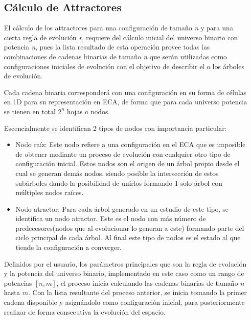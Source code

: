\documentclass[]{article}
\begin{document}
		\subsection{Cálculo de Attractores}
			\justifying
			El cálculo de los attractores para una configuración de tamaño \textit{n} y para una cierta regla de evolución \textit{r}, requiere del cálculo inicial del universo binario con potencia \textit{n}, pues la lista resultado de esta operación provee todas las combinaciones de cadenas binarias de tamaño \textit{n} que serán utilizadas como configuraciones iniciales de evolución con el objetivo de describir el o los árboles de evolución.
			
			\hfill\break
			\justifying
			Cada cadena binaria corresponderá con una configuración en su forma de células en 1D para su representación en ECA, de forma que para cada universo potencia se tienen en total $2^n$ hojas o nodos.
			
			\hfill\break
			\justifying
			Escencialmente se identifican 2 tipos de nodos con importancia particular:
			\begin{itemize}
				\item Nodo raíz: Este nodo refiere a una configuración en el ECA que es imposible de obtener mediante un proceso de evolución con cualquier otro tipo de configuración inicial. Estos nodos son el origen de un árbol propio desde el cual se generan demás nodos, siendo posible la intersección de estos subárboles dando la posibilidad de unirlos formando 1 solo árbol con múltiples nodos raíces.
				
				\item Nodo atractor: Para cada árbol generado en un estudio de este tipo, se identifica un nodo atractor. Este es el nodo con más número de predecesores(nodos que al evolucionar lo generan a este) formando parte del ciclo principal de cada árbol. Al final este tipo de nodos es el estado al que tiende la configuración a converger.
			\end{itemize}
		
			\hfill\break
			\justifying
			Definidos por el usuario, los parámetros principales que son la regla de evolución y la potencia del universo binario, implementado en este caso como un rango de potencias $[n,m]$, el proceso inicia calculando las cadenas binarias de tamaño $n$ hasta $m$. Con la lista resultante del proceso anterior, se inicia tomando la primer cadena disponible y asignándolo como configuración inicial, para posteriormente realizar de forma consecutiva la evolución del espacio.
			
\end{document}
